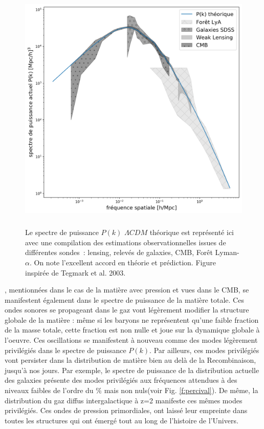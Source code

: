 \begin{figure}[htbp]
	\centering
		\includegraphics[height=12cm]{figs/pstegmark.png}
		\caption[Le spectre de puissance observé]{Le spectre de puissance $P(k)$ $\Lambda CDM$ théorique est représenté ici avec une compilation des estimations observationnelles issues de différentes sondes~: lensing, relevés de galaxies, CMB, Forêt Lyman-$\alpha$. On note l'excellent accord en théorie et prédiction.  Figure inspirée de Tegmark et al. 2003. }
	\label{f:pktegmark}
\end{figure}


, mentionnées dans le cas de la matière avec pression et vues dans le CMB, se manifestent également dans le spectre de puissance de la matière totale. Ces ondes sonores se propageant dans le gaz vont légèrement modifier la structure globale de la matière : même si les baryons ne représentent qu'une faible fraction de la masse totale, cette fraction est non nulle et joue sur la dynamique globale à l'oeuvre. Ces oscillations se manifestent à nouveau comme des modes légèrement privilégiés dans le spectre de puissance $P(k)$. Par ailleurs, ces modes privilégiés vont persister dans la distribution de matière bien au delà de la Recombinaison, jusqu'à nos jours. Par exemple, le spectre de puissance de la distribution actuelle des galaxies  présente des modes privilégiés aux fréquences attendues à des niveaux faibles de l'ordre du $\%$ mais non nuls(voir Fig. \ref{f:percival}). De même, la distribution du gaz diffus intergalactique à z=2 manifeste ces mêmes modes privilégiés. Ces ondes de pression primordiales, ont laissé leur empreinte dans toutes les structures qui ont émergé tout au long de l'histoire de l'Univers.

